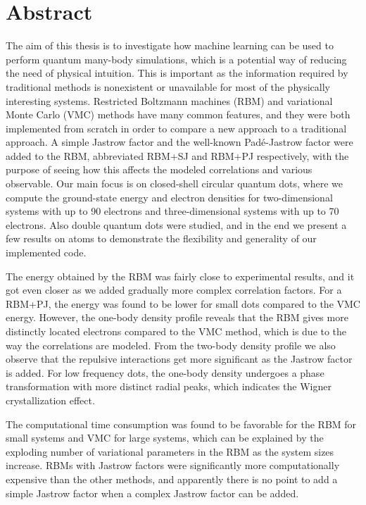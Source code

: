 \section*{Abstract}
The aim of this thesis is to investigate how machine learning can be used to perform quantum many-body simulations, which is a potential way of reducing the need of physical intuition. This is important as the information required by traditional methods is nonexistent or unavailable for most of the physically interesting systems. Restricted Boltzmann machines (RBM) and variational Monte Carlo (VMC) methods have many common features, and they were both implemented from scratch in order to compare a new approach to a traditional approach. A simple Jastrow factor and the well-known Padé-Jastrow factor were added to the RBM, abbreviated RBM+SJ and RBM+PJ respectively, with the purpose of seeing how this affects the modeled correlations and various observable. Our main focus is on closed-shell circular quantum dots, where we compute the ground-state energy and electron densities for two-dimensional systems with up to 90 electrons and three-dimensional systems with up to 70 electrons. Also double quantum dots were studied, and in the end we present a few results on atoms to demonstrate the flexibility and generality of our implemented code.

The energy obtained by the RBM was fairly close to experimental results, and it got even closer as we added gradually more complex correlation factors. For a RBM+PJ, the energy was found to be lower for small dots compared to the VMC energy. However, the one-body density profile reveals that the RBM gives more distinctly located electrons compared to the VMC method, which is due to the way the correlations are modeled. From the two-body density profile we also observe that the repulsive interactions get more significant as the Jastrow factor is added. For low frequency dots, the one-body density undergoes a phase transformation with more distinct radial peaks, which indicates the Wigner crystallization effect.

The computational time consumption was found to be favorable for the RBM for small systems and VMC for large systems, which can be explained by the exploding number of variational parameters in the RBM as the system sizes increase. RBMs with Jastrow factors were significantly more computationally expensive than the other methods, and apparently there is no point to add a simple Jastrow factor when a complex Jastrow factor can be added. 

